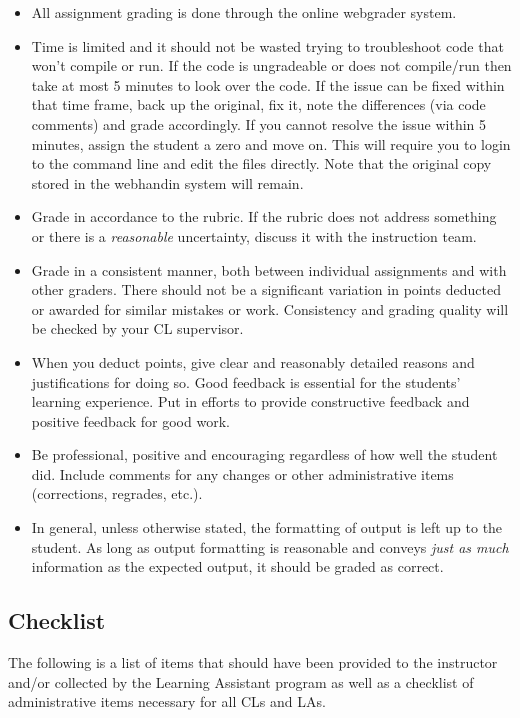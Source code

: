 \documentclass[12pt]{scrartcl}
\begin{document}
\begin{itemize}
  \item All assignment grading is done through the online webgrader system.  
  \item Time is limited and it should not be wasted trying to troubleshoot 
    code that won't compile or run.  If the code is ungradeable or does not
    compile/run then take at most 5 minutes to look over
    the code.  If the issue can be fixed within that time frame, back up the
    original, fix it, note the differences (via code comments) and grade 
    accordingly.  If you cannot resolve the issue within 5 minutes, assign
    the student a zero and move on.  This will require you to login to the
    command line and edit the files directly.  Note that the original copy
    stored in the webhandin system will remain.
  \item Grade in accordance to the rubric.  If the rubric 
    does not address something or there is a \emph{reasonable} uncertainty, 
    discuss it with the instruction team.
  \item Grade in a consistent manner, both between individual assignments and
    with other graders.  There should not be a significant variation in
    points deducted or awarded for similar mistakes or work.  Consistency 
    and grading quality will be checked by your CL supervisor.
  \item When you deduct points, give clear and reasonably detailed reasons
    and justifications for doing so.  Good feedback is essential for the
    students' learning experience.  Put in efforts to provide constructive
    feedback and positive feedback for good work.
  \item Be professional, positive and encouraging regardless of how well 
    the student did.  Include comments for any changes or other administrative 
    items (corrections, regrades, etc.).
  \item In general, unless otherwise stated, the formatting of output is
    left up to the student.  As long as output formatting is reasonable and
    conveys \emph{just as much} information as the expected output, it should
    be graded as correct.
\end{itemize}

\subsection*{Checklist}

The following is a list of items that should have been provided to 
the instructor and/or collected by the Learning Assistant program
as well as a checklist of administrative items necessary for all
CLs and LAs.
\end{document}
